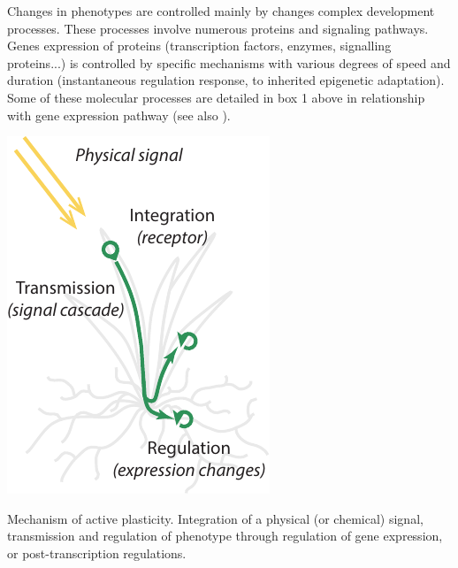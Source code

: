 Changes in phenotypes are controlled mainly by changes complex development processes. These processes involve numerous proteins and signaling pathways. Genes expression of proteins (transcription factors, enzymes, signalling proteins...) is controlled by specific mechanisms with various degrees of speed and duration (instantaneous regulation response, to inherited epigenetic adaptation). Some of these molecular processes are detailed in box 1 above in relationship with gene expression pathway (see also \citet{nicotra_plant_2010}).\\


\begin{marginfigure}[-24pt]
    \includegraphics[width=1\linewidth]{./Figures/active_plasticity_m.pdf}
  \caption[Active plasticity]{Mechanism of active plasticity. Integration of a physical (or chemical) signal, transmission and regulation of phenotype through regulation of gene expression, or post-transcription regulations.}
  \label{fig:active_plasticity}
\end{marginfigure}

